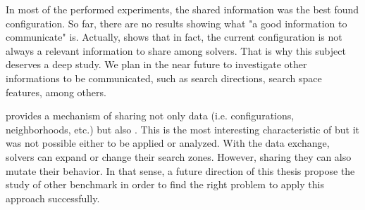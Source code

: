 In most of the performed experiments, the shared information was the best found configuration. So far, there are no results showing what "a good information to communicate" is. Actually, \cite{Caniou14} shows that in fact, the current configuration is not always a relevant information to share among solvers. That is why this subject deserves a deep study. We plan in the near future to investigate other informations to be communicated, such as search directions, search space features, among others.

\posl{} provides a mechanism of sharing not only data (i.e. configurations, neighborhoods, etc.) but also \oms{}. This is the most interesting characteristic of \posl{} but it was not possible either to be applied or analyzed. With the data exchange, solvers can expand or change their search zones. However, sharing \ms{} they can also mutate their behavior. In that sense, a future direction of this thesis propose the study of other benchmark in order to find the right problem to apply this approach successfully.